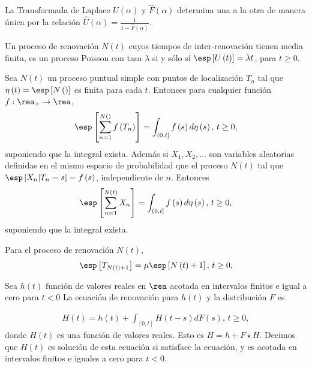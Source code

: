 \begin{Prop}
La Transformada de Laplace $\hat{U}\left(\alpha\right)$ y $\hat{F}\left(\alpha\right)$ determina una a la otra de manera \'unica por la relaci\'on $\hat{U}\left(\alpha\right)=\frac{1}{1-\hat{F}\left(\alpha\right)}$.
\end{Prop}


\begin{Note}
Un proceso de renovaci\'on $N\left(t\right)$ cuyos tiempos de inter-renovaci\'on tienen media finita, es un proceso Poisson con tasa $\lambda$ si y s\'olo s\'i $\esp\left[U\left(t\right)\right]=\lambda t$, para $t\geq0$.
\end{Note}


\begin{Teo}
Sea $N\left(t\right)$ un proceso puntual simple con puntos de localizaci\'on $T_{n}$ tal que $\eta\left(t\right)=\esp\left[N\left(\right)\right]$ es finita para cada $t$. Entonces para cualquier funci\'on $f:\rea_{+}\rightarrow\rea$,
\begin{eqnarray*}
\esp\left[\sum_{n=1}^{N\left(\right)}f\left(T_{n}\right)\right]=\int_{\left(0,t\right]}f\left(s\right)d\eta\left(s\right)\textrm{,  }t\geq0,
\end{eqnarray*}
suponiendo que la integral exista. Adem\'as si $X_{1},X_{2},\ldots$ son variables aleatorias definidas en el mismo espacio de probabilidad que el proceso $N\left(t\right)$ tal que $\esp\left[X_{n}|T_{n}=s\right]=f\left(s\right)$, independiente de $n$. Entonces
\begin{eqnarray*}
\esp\left[\sum_{n=1}^{N\left(t\right)}X_{n}\right]=\int_{\left(0,t\right]}f\left(s\right)d\eta\left(s\right)\textrm{,  }t\geq0,
\end{eqnarray*} 
suponiendo que la integral exista. 
\end{Teo}

\begin{Coro}
Para el proceso de renovaci\'on $N\left(t\right)$,
\begin{eqnarray*}
\esp\left[T_{N\left(t\right)+1}\right]=\mu\esp\left[N\left(t\right)+1\right]\textrm{,  }t\geq0,
\end{eqnarray*}  
\end{Coro}


\begin{Def}
Sea $h\left(t\right)$ funci\'on de valores reales en $\rea$ acotada en intervalos finitos e igual a cero para $t<0$ La ecuaci\'on de renovaci\'on para $h\left(t\right)$ y la distribuci\'on $F$ es

\begin{eqnarray}%
H\left(t\right)=h\left(t\right)+\int_{\left[0,t\right]}H\left(t-s\right)dF\left(s\right)\textrm{,    }t\geq0,
\end{eqnarray}
donde $H\left(t\right)$ es una funci\'on de valores reales. Esto es $H=h+F\star H$. Decimos que $H\left(t\right)$ es soluci\'on de esta ecuaci\'on si satisface la ecuaci\'on, y es acotada en intervalos finitos e iguales a cero para $t<0$.
\end{Def}

